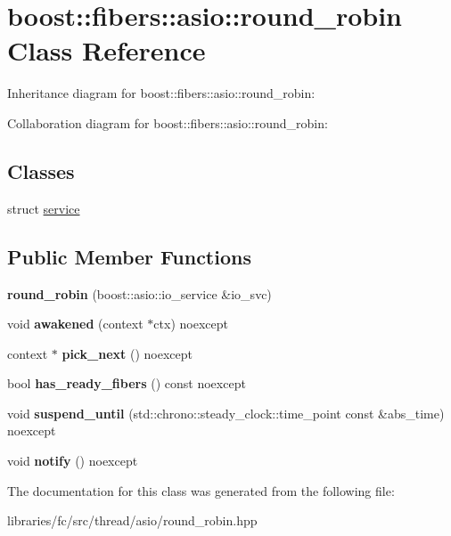 \hypertarget{classboost_1_1fibers_1_1asio_1_1round__robin}{}\section{boost\+:\+:fibers\+:\+:asio\+:\+:round\+\_\+robin Class Reference}
\label{classboost_1_1fibers_1_1asio_1_1round__robin}


Inheritance diagram for boost\+:\+:fibers\+:\+:asio\+:\+:round\+\_\+robin\+:


Collaboration diagram for boost\+:\+:fibers\+:\+:asio\+:\+:round\+\_\+robin\+:
\subsection*{Classes}
\begin{DoxyCompactItemize}
\item 
struct \mbox{\hyperlink{structboost_1_1fibers_1_1asio_1_1round__robin_1_1service}{service}}
\end{DoxyCompactItemize}
\subsection*{Public Member Functions}
\begin{DoxyCompactItemize}
\item 
\mbox{\label{classboost_1_1fibers_1_1asio_1_1round__robin_aee1131d9ade630b117f0e208d24487f0}} 
{\bfseries round\+\_\+robin} (boost\+::asio\+::io\+\_\+service \&io\+\_\+svc)
\item 
\mbox{\label{classboost_1_1fibers_1_1asio_1_1round__robin_af0b5f5de86abf157f4f92d499b1ffaee}} 
void {\bfseries awakened} (context $\ast$ctx) noexcept
\item 
\mbox{\label{classboost_1_1fibers_1_1asio_1_1round__robin_acd5370f8cce4dc6a86d767f6df7dd709}} 
context $\ast$ {\bfseries pick\+\_\+next} () noexcept
\item 
\mbox{\label{classboost_1_1fibers_1_1asio_1_1round__robin_a7a2c74f6bda80e69c87bf52a0ae79c62}} 
bool {\bfseries has\+\_\+ready\+\_\+fibers} () const noexcept
\item 
\mbox{\label{classboost_1_1fibers_1_1asio_1_1round__robin_ac45de1f9a2b54df5b615a6e9d5b5a411}} 
void {\bfseries suspend\+\_\+until} (std\+::chrono\+::steady\+\_\+clock\+::time\+\_\+point const \&abs\+\_\+time) noexcept
\item 
\mbox{\label{classboost_1_1fibers_1_1asio_1_1round__robin_aac505bb623204b864769bfc80f26a408}} 
void {\bfseries notify} () noexcept
\end{DoxyCompactItemize}


The documentation for this class was generated from the following file\+:\begin{DoxyCompactItemize}
\item 
libraries/fc/src/thread/asio/round\+\_\+robin.\+hpp\end{DoxyCompactItemize}
